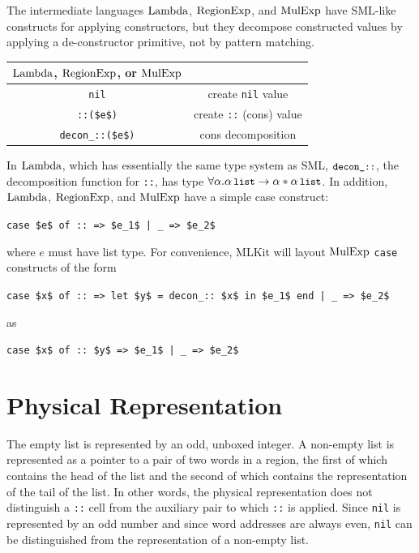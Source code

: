 \documentclass[12pt]{book}
\begin{document}
The intermediate languages $\hbox{\rm Lambda}$, $\hbox{\rm RegionExp}$, and $\hbox{\rm MulExp}$ have SML-like
constructs for applying constructors, but they decompose constructed values by
applying a
%
%
de-constructor primitive, not by pattern matching.
%
%
\begin{center}
\begin{tabular}{|c|c|}\hline
$\hbox{\rm Lambda}$, $\hbox{\rm RegionExp}$, or $\hbox{\rm MulExp}$ & \\ \hline
\lstinline!nil!                 & create \lstinline!nil! value \\
\lstinline!::($e$)!             & create \lstinline!::! (cons) value \\
\lstinline!decon_::($e$)!       & cons decomposition \\
\hline
\end{tabular}
\end{center}
In $\hbox{\rm Lambda}$, which has essentially the same type system as SML, $\mbox{\small\ttfamily decon\_::}$,
the decomposition function for \lstinline{::}, has type
$\forall\alpha.\alpha\,\mbox{\small\ttfamily list}\to\alpha\ast\alpha\,\mbox{\small\ttfamily list}$.  In addition,
$\hbox{\rm Lambda}$, $\hbox{\rm RegionExp}$, and $\hbox{\rm MulExp}$ have a simple case construct:
\begin{center}
  \lstinline!case $e$ of :: => $e_1$ | _ => $e_2$!
\end{center}
where $e$ must have list type. For convenience, MLKit will layout $\hbox{\rm MulExp}$
\lstinline{case} constructs of the form
\begin{center}
  \lstinline!case $x$ of :: => let $y$ = decon_:: $x$ in $e_1$ end | _ => $e_2$!
\end{center}
as
\begin{center}
  \lstinline!case $x$ of :: $y$ => $e_1$ | _ => $e_2$!
\end{center}

\section{Physical Representation}
\label{ublists.sec}

The empty list is represented by an odd, unboxed integer.  A non-empty list is
represented as a pointer to a pair of two words in a region, the first of which
contains the head of the list and the second of which contains the
representation of the tail of the list. In other words, the physical
representation does not distinguish a \lstinline{::} cell from the auxiliary
pair to which \lstinline{::} is applied. Since \lstinline{nil} is represented by
an odd number and since word addresses are always even, \lstinline{nil} can be
distinguished from the representation of a non-empty list.
\end{document}
